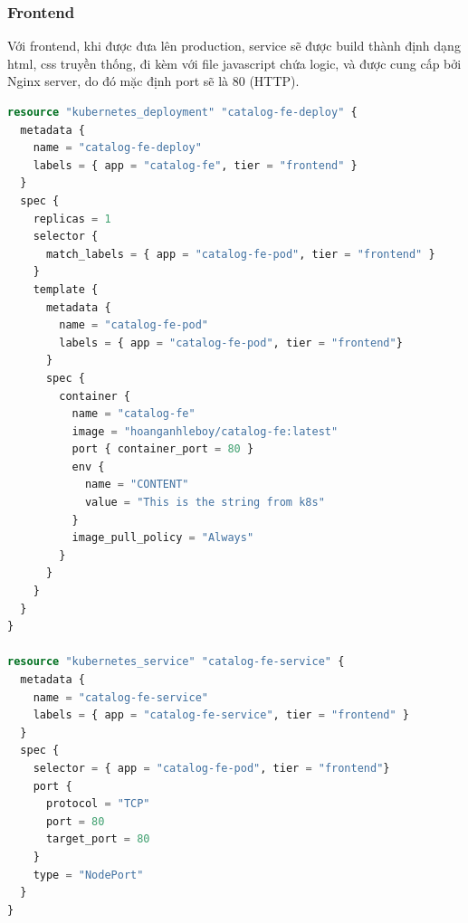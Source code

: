 \subsubsection*{Frontend}
\noindent Với frontend, khi được đưa lên production, service sẽ được build thành định dạng html, css truyền thống, đi kèm với file javascript chứa logic, và được cung cấp bởi Nginx server, do đó mặc định port sẽ là 80 (HTTP).
\begin{lstlisting}[language=terraform]
resource "kubernetes_deployment" "catalog-fe-deploy" {
  metadata {
    name = "catalog-fe-deploy"
    labels = { app = "catalog-fe", tier = "frontend" }
  }
  spec {
    replicas = 1
    selector {
      match_labels = { app = "catalog-fe-pod", tier = "frontend" }
    }
    template {
      metadata {
        name = "catalog-fe-pod"
        labels = { app = "catalog-fe-pod", tier = "frontend"}
      }
      spec {
        container {
          name = "catalog-fe"
          image = "hoanganhleboy/catalog-fe:latest"
          port { container_port = 80 }
          env {
            name = "CONTENT"
            value = "This is the string from k8s"
          }
          image_pull_policy = "Always"
        }
      }
    }
  }
}

resource "kubernetes_service" "catalog-fe-service" {
  metadata {
    name = "catalog-fe-service"
    labels = { app = "catalog-fe-service", tier = "frontend" }
  }
  spec {
    selector = { app = "catalog-fe-pod", tier = "frontend"}
    port {
      protocol = "TCP"
      port = 80
      target_port = 80
    }
    type = "NodePort"
  }
}
\end{lstlisting} 
